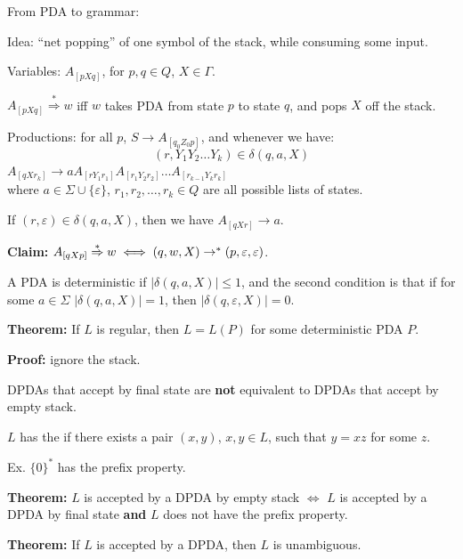 \begin{frame}
From PDA to grammar:

Idea: ``net popping'' of one symbol of the stack, while consuming some
input.

Variables: $A_{[pXq]}$, for $p,q\in Q$, $X\in\Gamma$.  

$A_{[pXq]}\stackrel{*}{\Rightarrow}w$ iff $w$ takes PDA from state $p$
to state $q$, and pops $X$ off the stack.

Productions: for all $p$, $S\longrightarrow A_{[q_0Z_0p]}$, and
whenever we have:
$$
(r,Y_1Y_2\ldots Y_k)\in\delta(q,a,X)
$$ 
$A_{[qXr_k]}\longrightarrow aA_{[rY_1r_1]}A_{[r_1Y_2r_2]}\ldots
A_{[r_{k-1}Y_kr_k]}$ \\
where $a\in\Sigma\cup\{\varepsilon\}$, $r_1,r_2,\ldots,r_k\in Q$ are
all possible lists of states.

If $(r,\varepsilon)\in\delta(q,a,X)$, then we have
$A_{[qXr]}\longrightarrow a$.

{\bf Claim:} $A_{[qXp]}\stackrel{*}{\Rightarrow} w \iff
(q,w,X)\rightarrow^*(p,\varepsilon,\varepsilon)$.
\end{frame}

\begin{frame}
A PDA is deterministic if $|\delta(q,a,X)|\le 1$, and the second
condition is that if for some $a\in\Sigma$ $|\delta(q,a,X)|=1$, then
$|\delta(q,\varepsilon,X)|=0$.

{\bf Theorem:} If $L$ is regular, then $L=L(P)$ for some deterministic
PDA $P$.

{\bf Proof:} ignore the stack.

DPDAs that accept by final state are {\bf not} equivalent to DPDAs
that accept by empty stack.
\end{frame}

\begin{frame}
$L$ has the  if there exists a pair $(x,y)$,
$x,y\in L$, such that $y=xz$ for some $z$.

Ex. $\{0\}^*$ has the prefix property.

{\bf Theorem:}  $L$ is accepted by a DPDA by empty stack $\iff$ $L$ is
accepted by a DPDA by final state {\bf and} $L$ does not have the
prefix property.

{\bf Theorem:}  If $L$ is accepted by a DPDA, then $L$ is unambiguous.
\end{frame}

